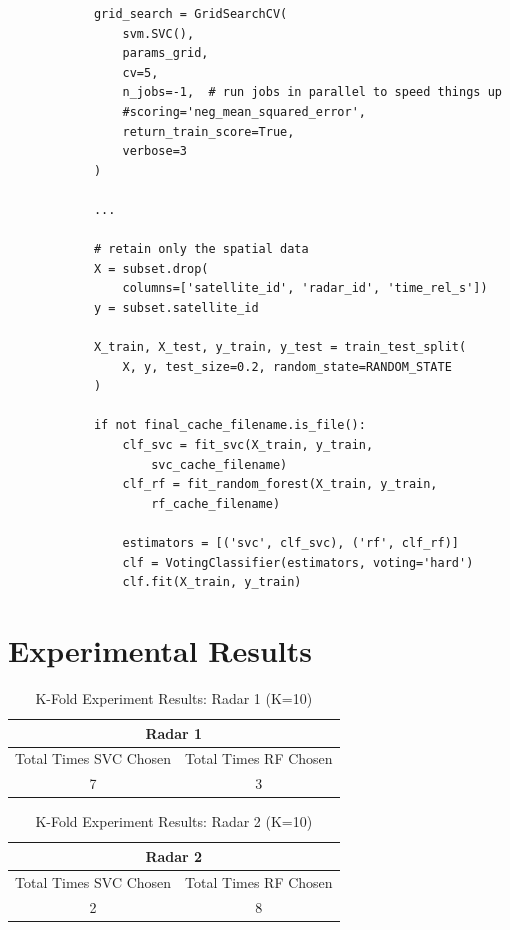\documentclass[./report_entry.tex]{subfiles}
\begin{document}
        \begin{verbatim}
            grid_search = GridSearchCV(
                svm.SVC(),
                params_grid,
                cv=5,
                n_jobs=-1,  # run jobs in parallel to speed things up
                #scoring='neg_mean_squared_error',
                return_train_score=True,
                verbose=3
            )

            ...

            # retain only the spatial data
            X = subset.drop(
                columns=['satellite_id', 'radar_id', 'time_rel_s'])
            y = subset.satellite_id
            
            X_train, X_test, y_train, y_test = train_test_split(
                X, y, test_size=0.2, random_state=RANDOM_STATE
            )
            
            if not final_cache_filename.is_file():
                clf_svc = fit_svc(X_train, y_train,     
                    svc_cache_filename)
                clf_rf = fit_random_forest(X_train, y_train, 
                    rf_cache_filename)
                
                estimators = [('svc', clf_svc), ('rf', clf_rf)]
                clf = VotingClassifier(estimators, voting='hard')
                clf.fit(X_train, y_train)
        \end{verbatim}

    \section*{Experimental Results}

            \begin{table}[htbp]
                \centering
                \caption{K-Fold Experiment Results: Radar 1 (K=10)}
                \begin{tabular}{|c|c|}
                    \hline
                    \multicolumn{2}{|c|}{\textbf{Radar 1}} \\ \hline
                    Total Times SVC Chosen & Total Times RF Chosen \\ \hline
                    7 & 3 \\ \hline
                \end{tabular}
                \label{k-radar1}
            \end{table}

            \begin{table}[htbp]
                \centering
                \caption{K-Fold Experiment Results: Radar 2 (K=10)}
                \begin{tabular}{|c|c|}
                    \hline
                    \multicolumn{2}{|c|}{\textbf{Radar 2}} \\ \hline
                    Total Times SVC Chosen & Total Times RF Chosen \\ \hline
                    2 & 8 \\ \hline
                \end{tabular}
                \label{k-radar2}
            \end{table}
\end{document}
